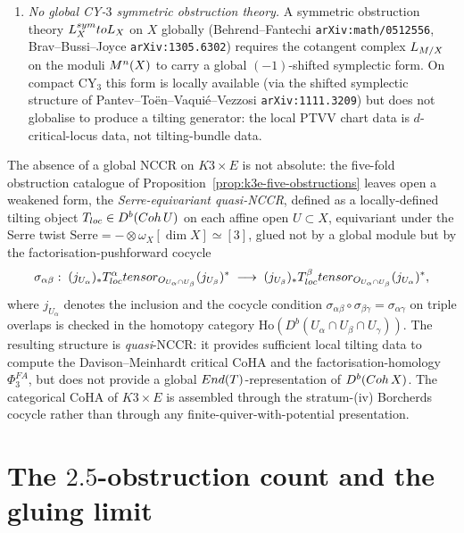 \begin{proposition}
\begin{enumerate}[label=\emph{(\alph*)}, leftmargin=2.5em]
\item \emph{No global CY-$3$ symmetric obstruction theory.} A
symmetric obstruction theory $L^{sym}_X to L_X$ on $X$
globally (Behrend--Fantechi \texttt{arXiv:math/0512556},
Brav--Bussi--Joyce \texttt{arXiv:1305.6302}) requires the cotangent
complex $L_{M/X}$ on the moduli $M^n(X)$ to carry a global
$(-1)$-shifted symplectic form. On compact CY$_3$ this form is locally
available (via the shifted symplectic structure of Pantev--Toën--Vaquié--Vezzosi
\texttt{arXiv:1111.3209}) but does not globalise to produce a tilting
generator: the local PTVV chart data is $d$-critical-locus data, not
tilting-bundle data.
\end{enumerate}
\end{proposition}

\begin{remark}
\label{rem:serre-equivariant}
The absence of a global NCCR on $K3 \times E$ is not absolute: the
five-fold obstruction catalogue of
Proposition~\ref{prop:k3e-five-obstructions} leaves open a weakened
form, the \emph{Serre-equivariant quasi-NCCR}, defined as a locally-defined
tilting object $T_{loc} \in D^b(Coh\,U)$ on each affine open
$U \subset X$, equivariant under the Serre twist
$\mathrm{Serre} = - \otimes \omega_X[\dim X] \simeq [3]$, glued not by a
global module but by the factorisation-pushforward cocycle
\[
  \sigma_{\alpha\beta}:\;
  (j_{U_\alpha})_\ast T_{loc}^\alpha tensor_{O_{U_\alpha \cap
  U_\beta}} (j_{U_\beta})^\ast \;\longrightarrow\;
  (j_{U_\beta})_\ast T_{loc}^\beta tensor_{O_{U_\alpha\cap
  U_\beta}} (j_{U_\alpha})^\ast,
\]
where $j_{U_\alpha}$ denotes the inclusion and the cocycle condition
$\sigma_{\alpha\beta}\circ\sigma_{\beta\gamma}
= \sigma_{\alpha\gamma}$ on triple overlaps is checked in the homotopy
category $\mathrm{Ho}(D^b(U_\alpha\cap U_\beta\cap U_\gamma))$. The
resulting structure is \emph{quasi}-NCCR: it provides sufficient local
tilting data to compute the Davison--Meinhardt critical CoHA and the
factorisation-homology $\Phi^{FA}_3$, but does not provide a global
$End(T)$-representation of $D^b(Coh\,X)$. The categorical CoHA of
$K3\times E$ is assembled through the stratum-(iv) Borcherds cocycle
rather than through any finite-quiver-with-potential presentation.
\end{remark}

\section{The $2.5$-obstruction count and the gluing limit}
\label{sec:limit-gluing}

